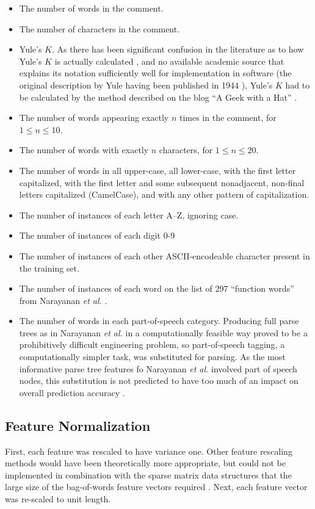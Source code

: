 \documentclass{article}
\begin{document}
\begin{itemize}
    \item The number of words in the comment.
    \item The number of characters in the comment.
    \item Yule's $K$. As there has been significant confusion in the literature as to how Yule's $K$ is actually calculated \cite{miranda2005yule}, and no available academic source that explains its notation sufficiently well for implementation in software (the original description by Yule having been published in 1944 \cite{yule1944statistical}), Yule's $K$ had to be calculated by the method described on the blog ``A Geek with a Hat'' \cite{teller2011measuring}.
    \item The number of words appearing exactly $n$ times in the comment, for $1 \le n \le 10$.
    \item The number of words with exactly $n$ characters, for $1 \le n \le 20$.
    \item The number of words in all upper-case, all lower-case, with the first letter capitalized, with the first letter and some subsequent nonadjacent, non-final letters capitalized (CamelCase), and with any other pattern of capitalization.
    \item The number of instances of each letter A--Z, ignoring case.
    \item The number of instances of each digit 0-9
    \item The number of instances of each other ASCII-encodeable character present in the training set.
    \item The number of instances of each word on the list of 297 ``function words'' from Narayanan \textit{et al.} \cite{narayanan2012feasibility}.
    \item The number of words in each part-of-speech category. Producing full parse trees as in Narayanan \textit{et al.} in a computationally feasible way proved to be a prohibitively difficult engineering problem, so part-of-speech tagging, a computationally simpler task, was substituted for parsing. As the most informative parse tree features fo Narayanan \textit{et al.} involved part of speech nodes, this substitution is not predicted to have too much of an impact on overall prediction accuracy \cite{narayanan2012feasibility}.
    
\end{itemize}

\subsection{Feature Normalization}
First, each feature was rescaled to have variance one. Other feature rescaling methods would have been theoretically more appropriate, but could not be implemented in combination with the sparse matrix data structures that the large size of the bag-of-words feature vectors required  \cite{narayanan2012feasibility}. Next, each feature vector was re-scaled to unit length.
\end{document}

